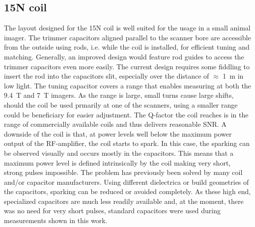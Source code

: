         \subsection{15N coil}
            The layout designed for the 15N coil is well suited for the usage in a small animal imager. The trimmer capacitors aligned parallel to the scanner bore are accessible from the outside using rods, i.e. while the coil is installed, for efficient tuning and matching. Generally, an improved design would feature rod guides to access the trimmer capacitors even more easily. The current design requires some fiddling to insert the rod into the capacitors slit, especially over the distance of $\approx$ \SI{1}{\meter} in low light.
            The tuning capacitor covers a range that enables measuring at both the \SI{9.4}{\tesla} and \SI{7}{\tesla} imagers. As the range is large, small turns cause large shifts, should the coil be used prmarily at one of the scanners, using a smaller range could be beneficiary for easier adjustment.
            The Q-factor the coil reaches is in the range of commercially available coils and thus delivers reasonable SNR.
            A downside of the coil is that, at power levels well below the maximum power output of the RF-amplifier, the coil starts to spark. In this case, the sparking can be observed visually and occurs mostly in the capacitors. This means that a maximum power level is defined intrinsically by the coil making very short, strong pulses impossible. The problem has previously been solved by many coil and/or capacitor manufacturers. Using different dielectrica or build geometries of the capacitors, sparking can be reduced or avoided completely. As these high end, specialized capacitors are much less readily available and, at the moment, there was no need for very short pulses, standard capacitors were used during measurements shown in this work.
